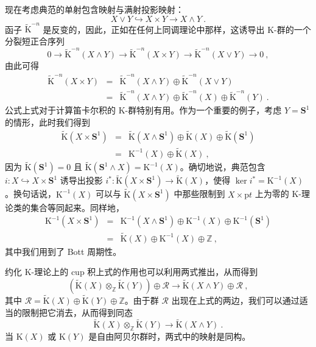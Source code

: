 \documentclass[11pt,a4paper]{ctexart}
\begin{document}
现在考虑典范的单射包含映射与满射投影映射： \[X\vee Y \hookrightarrow X\times Y \longrightarrow X\wedge Y\ .\] 函子 \(\widetilde{{\mathrm K}}^{-n}\) 是反变的，因此，正如在任何上同调理论中那样，这诱导出 K-群的一个分裂短正合序列 \[0\longrightarrow \widetilde{{\mathrm K}}^{-n}(X\wedge Y) \longrightarrow
\widetilde{{\mathrm K}}^{-n}(X\times Y)
\longrightarrow \widetilde{{\mathrm K}}^{-n}(X\vee Y) \longrightarrow 0\ ,\] 由此可得 \[\begin{matrix}
\widetilde{{\mathrm K}}^{-n}(X\times Y)&=& \widetilde{{\mathrm K}}^{-n}(X\wedge Y)\oplus
\widetilde{{\mathrm K}}^{-n}(X\vee Y)\\
&=& \widetilde{{\mathrm K}}^{-n}(X\wedge Y)\oplus \widetilde{{\mathrm K}}^{-n}(X)\oplus
\widetilde{{\mathrm K}}^{-n}(Y)\ .
\end{matrix}\] 公式上式对于计算笛卡尔积的 K-群特别有用。作为一个重要的例子，考虑 \(Y={\mathbf S}^1\) 的情形，此时我们得到 \[\begin{matrix}
\widetilde{{\mathrm K}}(X\times {\mathbf S}^1)&=& \widetilde{{\mathrm K}}(X\wedge {\mathbf
S}^1)\oplus \widetilde{{\mathrm K}}(X)\oplus
\widetilde{{\mathrm K}}({\mathbf S}^1)\\
&=& {\mathrm K}^{-1}(X)\oplus \widetilde{{\mathrm K}}(X)\ ,
\end{matrix}\] 因为 \(\widetilde{{\mathrm K}}({\mathbf S}^1)=0\) 且 \(\widetilde{{\mathrm K}}({\mathbf S}^1\wedge X)={\mathrm K}^{-1}(X)\)。确切地说，典范包含 \(i:X\hookrightarrow X\times {\mathbf S}^1\) 诱导出投影 \(i^*: \widetilde{{\mathrm K}}(X\times {\mathbf S}^1)\rightarrow
\widetilde{{\mathrm K}}(X)\)，使得 \(\ker i^*= {\mathrm K}^{-1}(X)\)。换句话说，\({\mathrm K}^{-1}(X)\) 可以与 \(\widetilde{{\mathrm K}}(X\times {\mathbf S}^1)\) 中那些限制到 \(X\times
{\mathrm pt}\) 上为零的 K-理论类的集合等同起来。同样地， \[\begin{matrix}
{\mathrm K}^{-1}(X\times {\mathbf S}^1)&=& {\mathrm K}^{-1}(X\wedge {\mathbf
S}^1)\oplus {\mathrm K}^{-1}(X)\oplus
{\mathrm K}^{-1}({\mathbf S}^1)\\
&=& \widetilde{{\mathrm K}}(X)\oplus{\mathrm K}^{-1}(X)\oplus{\mathbb{Z}}\ ,
\end{matrix}\] 其中我们用到了 Bott 周期性。

约化 K-理论上的 cup 积上式的作用也可以利用两式推出，从而得到 \[\left(\widetilde{{\mathrm K}}(X)\otimes_{{\mathbb{Z}}}\widetilde{{\mathrm K}}(Y)\right)\oplus{\mathcal R}
\longrightarrow \widetilde{{\mathrm K}}(X\wedge Y)\oplus {\mathcal R}\ ,\] 其中 \({\mathcal R}=\widetilde{{\mathrm K}}(X)\oplus\widetilde{{\mathrm K}}(Y)\oplus{\mathbb{Z}}\)。由于群 \({\mathcal R}\) 出现在上式的两边，我们可以通过适当的限制把它消去，从而得到同态 \[\widetilde{{\mathrm K}}(X)\otimes_{{\mathbb{Z}}}\widetilde{{\mathrm K}}(Y)\longrightarrow \widetilde{{\mathrm K}}(X\wedge Y)\ .\] 当 \({\mathrm K}(X)\) 或 \({\mathrm K}(Y)\) 是自由阿贝尔群时，两式中的映射是同构。
\end{document}

